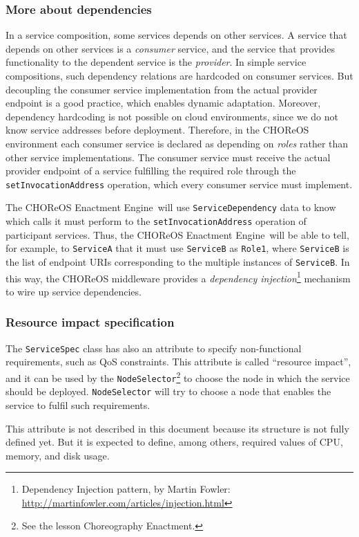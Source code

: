 \documentclass[a4paper, 10pt]{article}
\newcommand{\ee}{CHOReOS Enactment Engine}
\begin{document}
\subsubsection*{More about dependencies}

In a service composition, some services depends on other services. A service that depends on other services is a \emph{consumer} service, and the service that provides functionality to the dependent service is the \emph{provider}. In simple service compositions, such dependency relations are hardcoded on consumer services. But decoupling the consumer service implementation from the actual provider endpoint is a good practice, which enables dynamic adaptation. Moreover, dependency hardcoding is not possible on cloud environments, since we do not know service addresses before deployment. Therefore, in the CHOReOS environment each consumer service is declared as depending on \emph{roles} rather than other service implementations. The consumer service must receive the actual provider endpoint of a service fulfilling the required role through the \verb!setInvocationAddress! operation, which every consumer service must implement.  

The \ee\ will use \verb!ServiceDependency! data to know which calls it must perform to the  \verb!setInvocationAddress! operation of participant services. Thus, the \ee\ will be able to tell, for example, to \verb!ServiceA! that it must use \verb!ServiceB! as \verb!Role1!, where \verb!ServiceB! is the list of endpoint URIs corresponding to the multiple instances of \verb!ServiceB!. In this way, the CHOReOS middleware provides a \emph{dependency injection}\footnote{Dependency Injection pattern, by Martin Fowler: \url{http://martinfowler.com/articles/injection.html}} mechanism to wire up service dependencies.

\subsubsection*{Resource impact specification}

The \verb!ServiceSpec! class has also an attribute to specify non-functional requirements, such as QoS constraints. This attribute is called ``resource impact'', and it can be used by the \verb!NodeSelector!\footnote{See the lesson Choreography Enactment.} to choose the node in which the service should be deployed. \verb!NodeSelector! will try to choose a node that enables the service to fulfil such requirements.

This attribute is not described in this document because its structure is not fully defined yet. But it is expected to define, among others, required values of CPU, memory, and disk usage.
\end{document}
